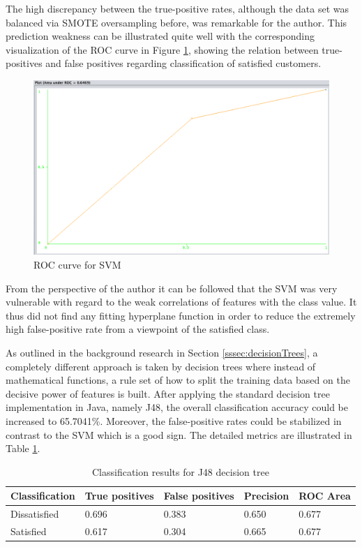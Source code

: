 The high discrepancy between the true-positive rates, although the data set was balanced via SMOTE oversampling before, was remarkable for the author. This prediction weakness can be illustrated quite well with the corresponding visualization of the ROC curve in Figure \ref{fig:rocCurveSVM}, showing the relation between true-positives and false positives regarding classification of satisfied customers. 

\begin{figure}
	\centering
	\includegraphics[width=1.0\textwidth]{img/rocResultSVM.png}
	\caption{ROC curve for SVM}
	\label{fig:rocCurveSVM}
\end{figure}

From the perspective of the author it can be followed that the SVM was very vulnerable with regard to the weak correlations of features with the class value. It thus did not find any fitting hyperplane function in order to reduce the extremely high false-positive rate from a viewpoint of the satisfied class. 

As outlined in the background research in Section \ref{sssec:decisionTrees}, a completely different approach is taken by decision trees where instead of mathematical functions, a rule set of how to split the training data based on the decisive power of features is built. After applying the standard decision tree implementation in Java, namely J48, the overall classification accuracy could be increased to 65.7041\%. Moreover, the false-positive rates could be stabilized in contrast to the SVM which is a good sign. The detailed metrics are illustrated in Table \ref{tab:decisionTreeResult}. 

\begin{table}[]
	\centering
	\begin{tabular}{|l|l|l|l|l|}
		\hline
		\textbf{Classification} & \textbf{True positives} & \textbf{False positives} & \textbf{Precision} & \textbf{ROC Area} \\ \hline
		Dissatisfied            & 0.696                 & 0.383                    & 0.650              & 0.677             \\ \hline
		Satisfied               & 0.617                   & 0.304                    & 0.665                & 0.677             \\ \hline
	\end{tabular}
	\caption{Classification results for J48 decision tree}
	\label{tab:decisionTreeResult}
\end{table}

